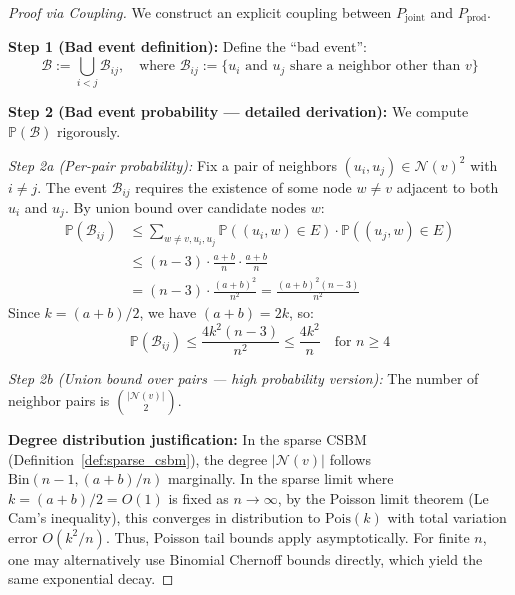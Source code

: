 \begin{proof}[Proof via Coupling]
We construct an explicit coupling between $P_{\mathrm{joint}}$ and $P_{\mathrm{prod}}$.

\textbf{Step 1 (Bad event definition):} Define the ``bad event'':
\begin{equation}
    \mathcal{B} := \bigcup_{i < j} \mathcal{B}_{ij}, \quad \text{where } \mathcal{B}_{ij} := \{u_i \text{ and } u_j \text{ share a neighbor other than } v\}
\end{equation}

\textbf{Step 2 (Bad event probability --- detailed derivation):} We compute $\mathbb{P}(\mathcal{B})$ rigorously.

\textit{Step 2a (Per-pair probability):} Fix a pair of neighbors $(u_i, u_j) \in \mathcal{N}(v)^2$ with $i \neq j$. The event $\mathcal{B}_{ij}$ requires the existence of some node $w \neq v$ adjacent to both $u_i$ and $u_j$. By union bound over candidate nodes $w$:
\begin{align}
    \mathbb{P}(\mathcal{B}_{ij}) &\leq \sum_{w \neq v, u_i, u_j} \mathbb{P}((u_i, w) \in E) \cdot \mathbb{P}((u_j, w) \in E) \\
    &\leq (n - 3) \cdot \frac{a+b}{n} \cdot \frac{a+b}{n} \\
    &= (n-3) \cdot \frac{(a+b)^2}{n^2} = \frac{(a+b)^2 (n-3)}{n^2}
\end{align}
Since $k = (a+b)/2$, we have $(a+b) = 2k$, so:
\begin{equation}
    \mathbb{P}(\mathcal{B}_{ij}) \leq \frac{4k^2 (n-3)}{n^2} \leq \frac{4k^2}{n} \quad \text{for } n \geq 4
\end{equation}

\textit{Step 2b (Union bound over pairs --- high probability version):} The number of neighbor pairs is $\binom{|\mathcal{N}(v)|}{2}$.

\textbf{Degree distribution justification:} In the sparse CSBM (Definition~\ref{def:sparse_csbm}), the degree $|\mathcal{N}(v)|$ follows $\mathrm{Bin}(n-1, (a+b)/n)$ marginally. In the sparse limit where $k = (a+b)/2 = O(1)$ is fixed as $n \to \infty$, by the Poisson limit theorem (Le Cam's inequality), this converges in distribution to $\mathrm{Pois}(k)$ with total variation error $O(k^2/n)$. Thus, Poisson tail bounds apply asymptotically. For finite $n$, one may alternatively use Binomial Chernoff bounds directly, which yield the same exponential decay.


\end{proof}
